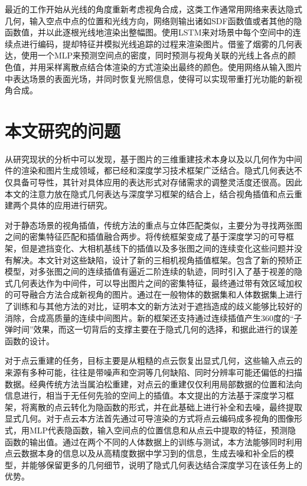 最近的工作开始从光线的角度重新考虑视角合成，这类工作通常用网络来表达隐式几何，输入空点中点的位置和光线方向，网络则输出诸如SDF函数值或者其他的隐函数值，并以此逐根光线地渲染出整幅图。\citet{sitzmann2019srns}使用LSTM来对场景中每个空间中的连续点进行编码，提却特征并模拟光线追踪的过程来渲染图片。\citet{mildenhall2020nerf}借鉴了烟雾的几何表达，使用一个MLP来预测空间点的密度，同时预测与视角关联的光线上各点的颜色值，并用采样离散点结合体渲染的方式渲染出最终的颜色。\citet{oechsle2020}使用网络从输入图片中表达场景的表面光场，并同时恢复光照信息，使得可以实现带重打光功能的新视角合成。


\section{本文研究的问题}
从研究现状的分析中可以发现，基于图片的三维重建技术本身以及以几何作为中间件的渲染和图片生成领域，都已经和深度学习技术框架广泛结合。隐式几何表达不仅具备可导性，其针对具体应用的表达形式对存储需求的调整灵活度还很高。因此本文的注意力放在隐式几何表达与深度学习框架的结合上，结合视角插值和点云重建两个具体的应用进行研究。

对于静态场景的视角插值，传统方法的重点与立体匹配类似，主要分为寻找两张图之间的密集特征匹配和插值融合两步\citep{seitz1996}。\citet{Ji_2017_CVPR}将传统框架变成了基于深度学习的可导框架，但是遮挡变化、大相机基线下的插值以及多张图之间的连续变化这些问题并没有解决。本文针对这些缺陷，设计了新的三相机视角插值框架。包含了新的预矫正模型，对多张图之间的连续插值有逼近二阶连续的轨迹，同时引入了基于视差的隐式几何表达作为中间件，可以导出图片之间的密集特征，最终通过带有效区域加权的可导融合方法合成新视角的图片。通过在一般物体的数据集\citep{shapenet2015}和人体数据集\citep{varol2017}上进行了训练和与其他方法的对比，证明本文的新方法对于遮挡造成的歧义能够比较好的消除，合成高质量的连续中间图片。新的框架还支持通过连续插值产生360度的“子弹时间”效果，而这一切背后的支撑主要在于隐式几何的选择，和据此进行的误差函数的设计。

对于点云重建的任务，目标主要是从粗糙的点云恢复出显式几何，这些输入点云的来源有多种可能，往往是带噪声和空洞等几何缺陷、同时分辨率可能还偏低的扫描数据。经典传统方法当属泊松重建\citep{kazhdan2013, kazhdan2006}，对点云的重建仅仅利用局部数据的位置和法向信息进行，相当于无任何先验的空间上的插值。本文提出的方法基于深度学习框架，将离散的点云转化为隐函数的形式，并在此基础上进行补全和去噪，最终提取显式几何。对于点云本方法首先通过可导渲染的方式将点云编码成多视角的图像形式，用MLP代表隐函数，输入空间点的位置信息和从点云中提取的特征，预测隐函数的输出值。通过在两个不同的人体数据上的训练与测试\citep{muller2009}，本方法能够同时利用点云数据本身的信息以及从高精度数据中学习到的信息，生成去噪和补全后的模型，并能够保留更多的几何细节，说明了隐式几何表达结合深度学习在该任务上的优势。

